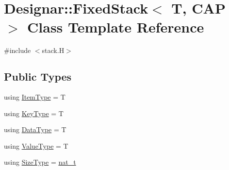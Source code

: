 \hypertarget{class_designar_1_1_fixed_stack}{}\section{Designar\+:\+:Fixed\+Stack$<$ T, C\+AP $>$ Class Template Reference}
\label{class_designar_1_1_fixed_stack}


{\ttfamily \#include $<$stack.\+H$>$}

\subsection*{Public Types}
\begin{DoxyCompactItemize}
\item 
using \hyperlink{class_designar_1_1_fixed_stack_a07f33a0a97fdebadd335de2f7f485942}{Item\+Type} = T
\item 
using \hyperlink{class_designar_1_1_fixed_stack_a9969f7d11746d55fe367a229bb75fa8f}{Key\+Type} = T
\item 
using \hyperlink{class_designar_1_1_fixed_stack_a4f0d06b958131d97f8084e7961d51577}{Data\+Type} = T
\item 
using \hyperlink{class_designar_1_1_fixed_stack_ad69de4dde252c1a48054ce62fbf05e95}{Value\+Type} = T
\item 
using \hyperlink{class_designar_1_1_fixed_stack_ae82564eb2309ec7a1bfd0c5bfbefc581}{Size\+Type} = \hyperlink{namespace_designar_aa72662848b9f4815e7bf31a7cf3e33d1}{nat\+\_\+t}
\end{DoxyCompactItemize}
